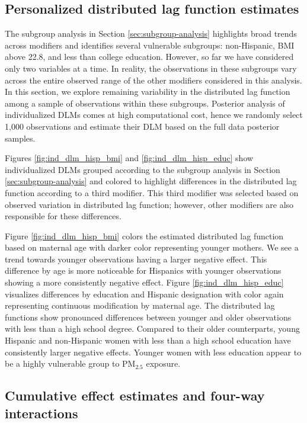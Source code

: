 \documentclass[12pt]{article}
\begin{document}
\subsection{Personalized distributed lag function estimates}
The subgroup analysis in Section \ref{sec:subgroup-analysis} highlights broad trends across modifiers and identifies several vulnerable subgroups: non-Hispanic, BMI above 22.8, and less than college education. However, so far we have considered only two variables at a time. In reality, the observations in these subgroups vary across the entire observed range of the other modifiers considered in this analysis. In this section, we explore remaining variability in the distributed lag function among a sample of observations within these subgroups. Posterior analysis of individualized DLMs comes at high computational cost, hence we randomly select 1,000 observations and estimate their DLM based on the full data posterior samples.

Figures \ref{fig:ind_dlm_hisp_bmi} and \ref{fig:ind_dlm_hisp_educ} show individualized DLMs grouped according to the subgroup analysis in Section \ref{sec:subgroup-analysis} and colored to highlight differences in the distributed lag function according to a third modifier. This third modifier was selected based on observed variation in distributed lag function; however, other modifiers are also responsible for these differences.

Figure \ref{fig:ind_dlm_hisp_bmi} colors the estimated distributed lag function based on maternal age with darker color representing younger mothers. We see a trend towards younger observations having a larger negative effect. This difference by age is more noticeable for Hispanics with younger observations showing a more consistently negative effect. Figure \ref{fig:ind_dlm_hisp_educ} visualizes differences by education and Hispanic designation with color again representing continuous modification by maternal age. The distributed lag functions show pronounced differences between younger and older observations with less than a high school degree. Compared to their older counterparts, young Hispanic and non-Hispanic women with less than a high school education have consistently larger negative effects. Younger women with less education appear to be a highly vulnerable group to PM$_{2.5}$ exposure.


\subsection{Cumulative effect estimates and four-way interactions}
\end{document}
